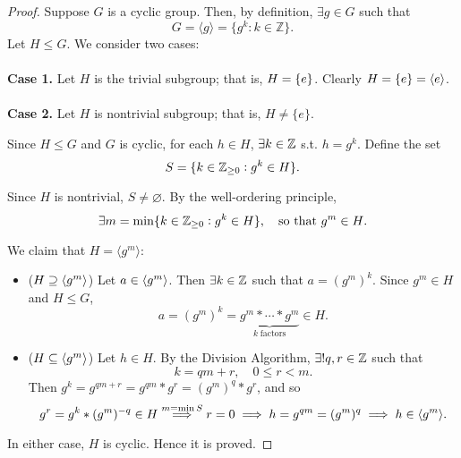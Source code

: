 \documentclass[11pt,openany]{article}
\begin{document}
\newpage

\newpage
{}
\begin{proof}
Suppose \(G\) is a cyclic group. Then, by definition, \(\exists g \in G\) such that \[
G = \langle g \rangle = \{g^k : k \in \mathbb{Z}\}.
\] Let \(H\leq G\). We consider two cases:\\
\ \\ \noindent
\textbf{Case 1.}\; Let \(H\) is the trivial subgroup; that is, $H=\set{e}$. Clearly $H=\set{e}=\langle e \rangle$.
\ \\ \noindent
\textbf{Case 2.}\; Let \(H\) is nontrivial subgroup; that is, \(H \neq \{e\}\).

Since \(H\leq G\) and \(G\) is cyclic, for each \(h\in H\), $\exists k\in\mathbb{Z}$ s.t. $h=g^k$. Define the set \[
S = \{k \in \mathbb{Z}_{\geq 0} : g^k \in H\}.
\] 

Since \(H\) is nontrivial, \(S\neq\varnothing\). By the well-ordering principle, \[
\exists m = \min\{k \in \mathbb{Z}_{\geq 0} : g^k \in H\},\quad\text{so that $g^m \in H$.}
\] 

We claim that $H = \langle g^m \rangle$:
\begin{itemize}
	\item[] ($H\supseteq\langle g^m \rangle$)\; Let $a\in\langle g^m \rangle$. Then $\exists k\in\mathbb{Z}$ such that $a=(g^m)^k$. Since $g^m\in H$ and $H\leq G$, \[
	a=(g^m)^k=\underbrace{g^m\ast\cdots\ast g^m}_{k\; \text{factors}}\in H.
	\]
	\item[] ($H\subseteq\langle g^m \rangle$)\; Let $h\in H$. By the Division Algorithm, $\exists!q,r\in \mathbb{Z}$ such that \[
	k = qm + r,\quad 0 \leq r < m.
	\] Then $g^k=g^{qm+r}=g^{qm}\ast g^r=(g^m)^q\ast g^r$, and so \[
	g^r=g^k\ast (g^m)^{-q}\in H\overset{m=\min S}{\implies} r=0\implies h=g^{qm}=(g^m)^q\implies h\in\langle g^m \rangle.
	\]
\end{itemize}
In either case, \(H\) is cyclic. Hence it is proved.
\end{proof}
\vfill
{}
\end{document}
